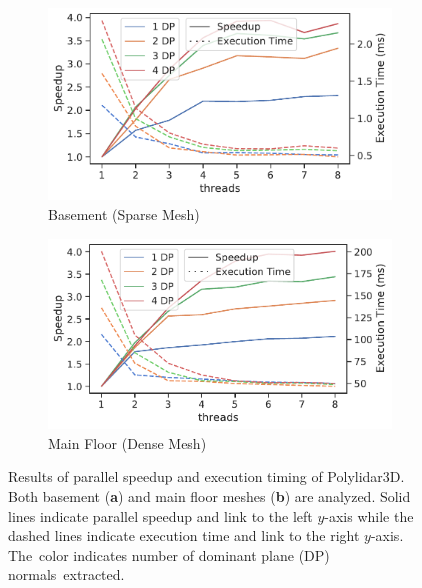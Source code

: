 \begin{figure}[!ht]
  \begin{subfigure}[t]{.49\linewidth}
    \centering\includegraphics[width=.95\linewidth]{chapter_3_polylidar3d/imgs/meshes/basement_speedup.pdf}
    \caption{\label{fig:ch3_mesh_parallel_a}Basement (Sparse Mesh)}
  \end{subfigure}
  \begin{subfigure}[t]{.49\linewidth}
    \centering\includegraphics[width=.95\linewidth]{chapter_3_polylidar3d/imgs/meshes/mainfloor_speedup.pdf}
    \caption{\label{fig:ch3_mesh_parallel_b}Main Floor (Dense Mesh)}
  \end{subfigure}
  \caption[Results of parallel speedup and execution timing of Polylidar3D]{Results of parallel speedup and execution timing of Polylidar3D. Both basement (\textbf{a}) and main floor meshes (\textbf{b}) are analyzed. Solid lines indicate parallel speedup and link to the left $y$-axis while the dashed lines indicate execution time and link to the right $y$-axis. The~color indicates number of dominant plane (DP) normals~extracted.}\label{fig:ch3_mesh_parallel}
\end{figure}
\unskip



